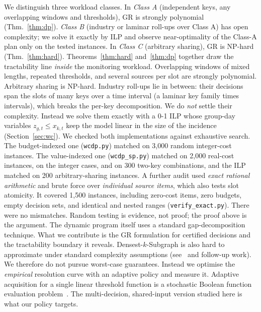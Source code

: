 \documentclass[conference]{IEEEtran}
\begin{document}
We distinguish three workload classes. In \emph{Class A} (independent keys, any overlapping windows and
thresholds), GR is strongly polynomial (Thm.~\ref{thm:dp}). \emph{Class B} (industry or laminar roll-ups over Class A)
has open complexity; we solve it exactly by ILP and observe near-optimality of the Class-A plan only on the tested
instances. In \emph{Class C} (arbitrary sharing), GR is NP-hard (Thm.~\ref{thm:hard}). Theorems~\ref{thm:hard}
and~\ref{thm:dp} together draw the tractability line \emph{inside} the monitoring workload.
Overlapping windows of mixed lengths, repeated thresholds, and several sources per slot are strongly polynomial.
Arbitrary sharing is NP-hard. Industry roll-ups lie in between: their decisions span the slots of many keys over a time
interval (a laminar key family times intervals), which breaks the per-key decomposition. We do \emph{not} settle their
complexity. Instead we solve them exactly with a 0-1 ILP whose group-day variables $z_{g,t}\le x_{k,t}$ keep the model
linear in the size of the incidence (Section~\ref{sec:wc}). We checked both implementations against exhaustive search. The budget-indexed one (\texttt{wcdp.py}) matched on 3{,}000
random integer-cost instances. The value-indexed one (\texttt{wcdp\_sp.py}) matched on 2{,}000 real-cost instances, on
the integer cases, and on 300 two-key combinations, and the ILP matched on 200 arbitrary-sharing instances. A further audit used \emph{exact rational
arithmetic} and brute force over \emph{individual source items}, which also tests slot atomicity. It covered 1{,}500
instances, including zero-cost items, zero budgets, empty decision sets, and identical and nested ranges
(\texttt{verify\_exact.py}). There were no mismatches. Random testing is evidence, not proof; the proof above is the
argument. The dynamic program itself uses a standard
gap-decomposition technique. What we contribute is the GR formulation for certified decisions and the tractability
boundary it reveals.
Densest-$k$-Subgraph is also hard to approximate under standard complexity assumptions (see~\cite{feige2001dks} and
follow-up work). We therefore do not pursue worst-case guarantees. Instead we optimise the \emph{empirical} resolution
curve with an adaptive policy and measure it. Adaptive acquisition for a single linear threshold function is a
stochastic Boolean function evaluation problem~\cite{deshpande2014sbfe}. The multi-decision, shared-input version
studied here is what our policy targets.
\end{document}
